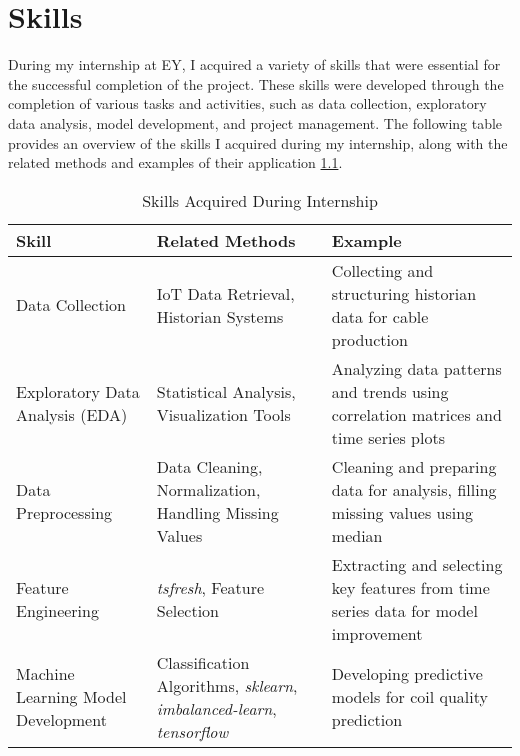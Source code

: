 \chapter{Skills}
\label{ch:skills}

During my internship at EY, I acquired a variety of skills that were essential
for the successful completion of the project. These skills were developed
through the completion of various tasks and activities, such as data
collection, exploratory data analysis, model development, and project
management. The following table provides an overview of the skills I acquired
during my internship, along with the related methods and examples of their
application \ref{tab:skills_acquired}.

\begin{table}[ht]
    \centering
    \renewcommand{\arraystretch}{1.5}
    \caption{\label{tab:skills_acquired}Skills Acquired During Internship}
    \begin{tabular}{|>{\raggedright}m{3cm}|>{\raggedright}m{5cm}|>{\raggedright\arraybackslash}m{7cm}|}
        \hline
        \textbf{Skill}                       & \textbf{Related Methods}                                                              & \textbf{Example}                                                                    \\
        \hline
        Data Collection                      & IoT Data Retrieval, Historian Systems                                                 & Collecting and structuring historian data for cable production                      \\
        \hline
        Exploratory Data Analysis (EDA)      & Statistical Analysis, Visualization Tools                                             & Analyzing data patterns and trends using correlation matrices and time series plots \\
        \hline
        Data Preprocessing                   & Data Cleaning, Normalization, Handling Missing Values                                 & Cleaning and preparing data for analysis, filling missing values using median       \\
        \hline
        Feature Engineering                  & \emph{tsfresh}, Feature Selection                                                     & Extracting and selecting key features from time series data for model improvement   \\
        \hline
        Machine Learning Model Development   & Classification Algorithms, \emph{sklearn}, \emph{imbalanced-learn}, \emph{tensorflow} & Developing predictive models for coil quality prediction                            \\

\end{tabular}
\end{table}
